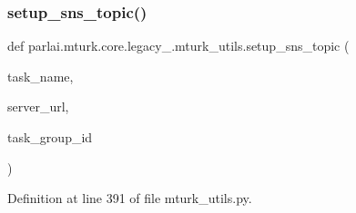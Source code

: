 \subsubsection{\texorpdfstring{setup\+\_\+sns\+\_\+topic()}{setup\_sns\_topic()}}
{\footnotesize\ttfamily def parlai.\+mturk.\+core.\+legacy\+\_.\+mturk\+\_\+utils.\+setup\+\_\+sns\+\_\+topic (\begin{DoxyParamCaption}\item[{}]{task\+\_\+name,  }\item[{}]{server\+\_\+url,  }\item[{}]{task\+\_\+group\+\_\+id }\end{DoxyParamCaption})}



Definition at line 391 of file mturk\+\_\+utils.\+py.


